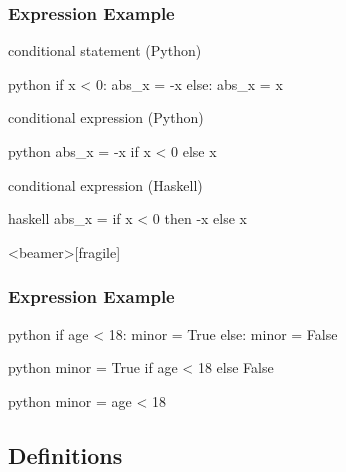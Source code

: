 \documentclass[dvipsnames]{beamer}
\theoremstyle{plain}
\begin{document}
\begin{frame}[fragile]
  \frametitle{Expression Example}

  \begin{exampleblock}{conditional statement (Python)}
    \begin{pygments}{python}
if x < 0:
    abs_x = -x
else:
    abs_x = x
    \end{pygments}
  \end{exampleblock}

  \pause
  \begin{exampleblock}{conditional expression (Python)}
    \begin{pygments}{python}
abs_x = -x if x < 0 else x
    \end{pygments}
  \end{exampleblock}

  \pause
  \begin{exampleblock}{conditional expression (Haskell)}
    \begin{pygments}{haskell}
abs_x = if x < 0 then -x else x
    \end{pygments}
  \end{exampleblock}
\end{frame}

\begin{frame}<beamer>[fragile]
  \frametitle{Expression Example}

  \begin{pygments}{python}
if age < 18:
    minor = True
else:
    minor = False
  \end{pygments}

  \medskip
  \begin{pygments}{python}
minor = True if age < 18 else False
  \end{pygments}

  \pause
  \bigskip
  \begin{pygments}{python}
minor = age < 18
  \end{pygments}
\end{frame}

\subsection{Definitions}
\end{document}
